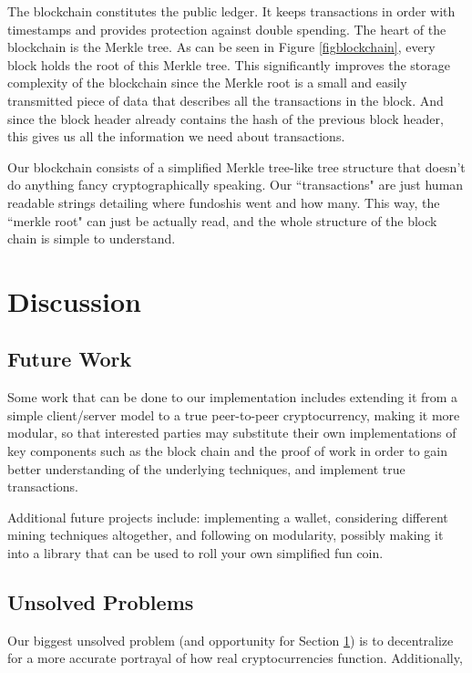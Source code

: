 \documentclass[12pt]{article}
\begin{document}
The blockchain constitutes the public ledger. It keeps transactions in order with timestamps and provides protection against double spending. The heart of the blockchain is the Merkle tree. As can be seen in Figure \ref{figblockchain}, every block holds the root of this Merkle tree. This significantly improves the storage complexity of the blockchain since the Merkle root is a small and easily transmitted piece of data that describes all the transactions in the block. And since the block header already contains the hash of the previous block header, this gives us all the information we need about transactions. 


Our blockchain consists of a simplified Merkle tree-like tree structure that doesn't do anything fancy cryptographically speaking. Our ``transactions" are just human readable strings detailing where fundoshis went and how many. This way, the ``merkle root" can just be actually read, and the whole structure of the block chain is simple to understand.

\section{Discussion}\label{future}
\subsection{Future Work}\label{work}
Some work that can be done to our implementation includes extending it from a simple client/server model to a true peer-to-peer cryptocurrency, making it more modular, so that interested parties may substitute their own implementations of key components such as the block chain and the proof of work in order to gain better understanding of the underlying techniques, and implement true transactions. 

Additional future projects include: implementing a wallet, considering different mining techniques altogether, and following on modularity, possibly making it into a library that can be used to roll your own simplified fun coin.

\subsection{Unsolved Problems}\label{unsolved}
Our biggest unsolved problem (and opportunity for Section \ref{future}) is to decentralize for a more accurate portrayal of how real cryptocurrencies function. Additionally, 



\end{document}
